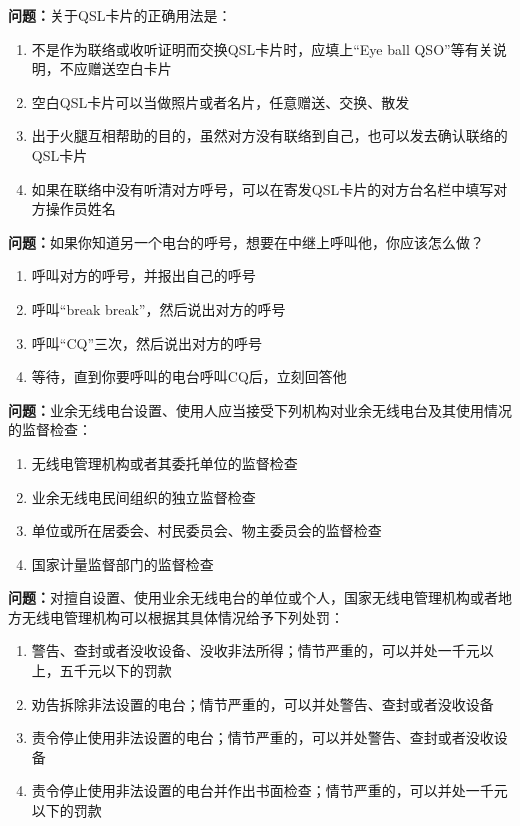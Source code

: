 \bigskip


\noindent\textbf{问题：}关于QSL卡片的正确用法是：
\begin{enumerate}[label=\Alph*), leftmargin=3em]
\item 不是作为联络或收听证明而交换QSL卡片时，应填上“Eye ball QSO”等有关说明，不应赠送空白卡片
\item 空白QSL卡片可以当做照片或者名片，任意赠送、交换、散发
\item 出于火腿互相帮助的目的，虽然对方没有联络到自己，也可以发去确认联络的QSL卡片
\item 如果在联络中没有听清对方呼号，可以在寄发QSL卡片的对方台名栏中填写对方操作员姓名
\end{enumerate}

\bigskip


\noindent\textbf{问题：}如果你知道另一个电台的呼号，想要在中继上呼叫他，你应该怎么做？
\begin{enumerate}[label=\Alph*), leftmargin=3em]
\item 呼叫对方的呼号，并报出自己的呼号
\item 呼叫“break break”，然后说出对方的呼号
\item 呼叫“CQ”三次，然后说出对方的呼号
\item 等待，直到你要呼叫的电台呼叫CQ后，立刻回答他
\end{enumerate}

\bigskip


\noindent\textbf{问题：}业余无线电台设置、使用人应当接受下列机构对业余无线电台及其使用情况的监督检查：
\begin{enumerate}[label=\Alph*), leftmargin=3em]
\item 无线电管理机构或者其委托单位的监督检查
\item 业余无线电民间组织的独立监督检查
\item 单位或所在居委会、村民委员会、物主委员会的监督检查
\item 国家计量监督部门的监督检查
\end{enumerate}

\bigskip


\noindent\textbf{问题：}对擅自设置、使用业余无线电台的单位或个人，国家无线电管理机构或者地方无线电管理机构可以根据其具体情况给予下列处罚：
\begin{enumerate}[label=\Alph*), leftmargin=3em]
\item 警告、查封或者没收设备、没收非法所得；情节严重的，可以并处一千元以上，五千元以下的罚款
\item 劝告拆除非法设置的电台；情节严重的，可以并处警告、查封或者没收设备
\item 责令停止使用非法设置的电台；情节严重的，可以并处警告、查封或者没收设备
\item 责令停止使用非法设置的电台并作出书面检查；情节严重的，可以并处一千元以下的罚款
\end{enumerate}

